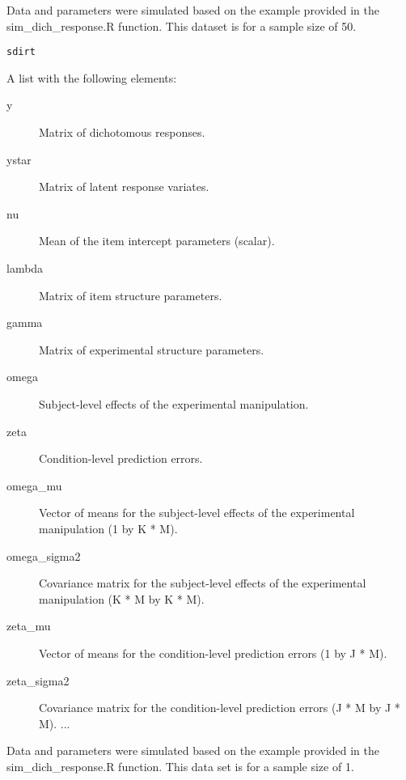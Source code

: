 \documentclass[a4paper]{book}
\begin{document}
%
\begin{Description}\relax
Data and parameters were simulated based on the example provided in the
sim\_dich\_response.R function. This dataset is for a sample size of 50.
\end{Description}
%
\begin{Usage}
\begin{verbatim}
sdirt
\end{verbatim}
\end{Usage}
%
\begin{Format}
A list with the following elements:
\begin{description}

\item[y] Matrix of dichotomous responses.
\item[ystar] Matrix of latent response variates.
\item[nu] Mean of the item intercept parameters (scalar).
\item[lambda] Matrix of item structure parameters.
\item[gamma] Matrix of experimental structure parameters.
\item[omega] Subject-level effects of the experimental manipulation.
\item[zeta] Condition-level prediction errors.
\item[omega\_mu] Vector of means for the subject-level effects of the
experimental manipulation (1 by K * M).
\item[omega\_sigma2] Covariance matrix for the subject-level effects of the
experimental manipulation (K * M by K * M).
\item[zeta\_mu] Vector of means for the condition-level prediction errors
(1 by J * M).
\item[zeta\_sigma2] Covariance matrix for the condition-level prediction
errors (J * M by J * M).
...

\end{description}

\end{Format}
%
\begin{Description}\relax
Data and parameters were simulated based on the example provided in the
sim\_dich\_response.R function. This data set is for a sample size of 1.
\end{Description}
\end{document}
